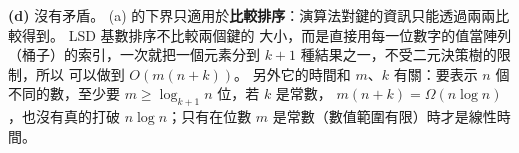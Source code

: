 \begin{pastsoln}
\textbf{(d)} 沒有矛盾。 (a) 的下界只適用於\textbf{比較排序}：演算法對鍵的資訊只能透過兩兩比較得到。 LSD 基數排序不比較兩個鍵的
大小，而是直接用每一位數字的值當陣列（桶子）的索引，一次就把一個元素分到 $k + 1$ 種結果之一，不受二元決策樹的限制，所以
可以做到 $O(m(n + k))$。 另外它的時間和 $m$、$k$ 有關：要表示 $n$ 個不同的數，至少要 $m \ge \log_{k+1} n$ 位，若 $k$ 是常數，
$m(n + k) = \Omega(n \log n)$，也沒有真的打破 $n \log n$；只有在位數 $m$ 是常數（數值範圍有限）時才是線性時間。
\end{pastsoln}
